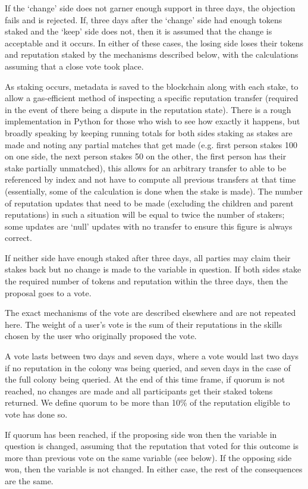 If the `change' side does not garner enough support in three days, the objection fails and is rejected.
If, three days after the `change' side had enough tokens staked and the `keep' side does not, then it is assumed that the change is acceptable and it occurs.  In either of these cases, the losing side loses their tokens and reputation staked by the mechanisms described below, with the calculations assuming that a close vote took place.

As staking occurs, metadata is saved to the blockchain along with each stake, to allow a gas-efficient method of inspecting a specific reputation transfer (required in the event of there being a dispute in the reputation state). There is a rough implementation in Python for those who wish to see how exactly it happens, but broadly speaking by keeping running totals for both sides staking as stakes are made and noting any partial matches that get made (e.g. first person stakes 100 on one side, the next person stakes 50 on the other, the first person has their stake partially unmatched), this allows for an arbitrary transfer to able to be referenced by index and not have to compute all previous transfers at that time (essentially, some of the calculation is done when the stake is made).  The number of reputation updates that need to be made (excluding the children and parent reputations) in such a situation will be equal to twice the number of stakers; some updates are `null' updates with no transfer to ensure this figure is always correct.

If neither side have enough staked after three days, all parties may claim their stakes back but no change is made to the variable in question. If both sides stake the required number of tokens and reputation within the three days, then the proposal goes to a vote.

The exact mechanisms of the vote are described elsewhere and are not repeated here. The weight of a user's vote is the sum of their reputations in the skills chosen by the user who originally proposed the vote.

A vote lasts between two days and seven days, where a vote would last two days if no reputation in the colony was being queried, and seven days in the case of the full colony being queried. At the end of this time frame, if quorum is not reached, no changes are made and all participants get their staked tokens returned. We define quorum to be more than 10\% of the reputation eligible to vote has done so.

If quorum has been reached, if the proposing side won then the variable in question is changed, assuming that the reputation that voted for this outcome is more than previous vote on the same variable (see below). If the opposing side won, then the variable is not changed. In either case, the rest of the consequences are the same.

